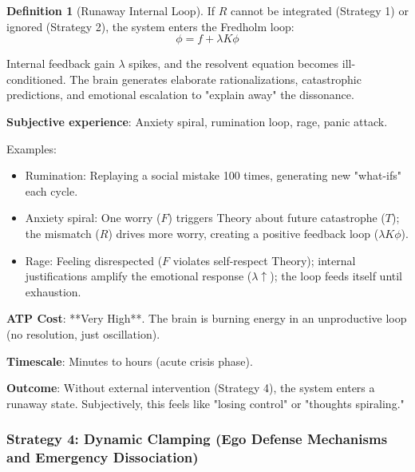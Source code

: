 \documentclass[11pt,oneside]{article}
\theoremstyle{definition}
\newtheorem{definition}[theorem]{Definition}
\begin{document}
\begin{definition}[Runaway Internal Loop]
If $R$ cannot be integrated (Strategy 1) or ignored (Strategy 2), the system enters the Fredholm loop:
\[
\phi = f + \lambda K\phi
\]

Internal feedback gain $\lambda$ spikes, and the resolvent equation becomes ill-conditioned. The brain generates elaborate rationalizations, catastrophic predictions, and emotional escalation to "explain away" the dissonance.

\textbf{Subjective experience}: Anxiety spiral, rumination loop, rage, panic attack.
\end{definition}

Examples:
\begin{itemize}
  \item Rumination: Replaying a social mistake 100 times, generating new "what-ifs" each cycle.
  \item Anxiety spiral: One worry ($F$) triggers Theory about future catastrophe ($T$); the mismatch ($R$) drives more worry, creating a positive feedback loop ($\lambda K\phi$).
  \item Rage: Feeling disrespected ($F$ violates self-respect Theory); internal justifications amplify the emotional response ($\lambda \uparrow$); the loop feeds itself until exhaustion.
\end{itemize}

\textbf{ATP Cost}: **Very High**. The brain is burning energy in an unproductive loop (no resolution, just oscillation).

\textbf{Timescale}: Minutes to hours (acute crisis phase).

\textbf{Outcome}: Without external intervention (Strategy 4), the system enters a runaway state. Subjectively, this feels like "losing control" or "thoughts spiraling."

\subsubsection{Strategy 4: Dynamic Clamping (Ego Defense Mechanisms and Emergency Dissociation)}
\end{document}
